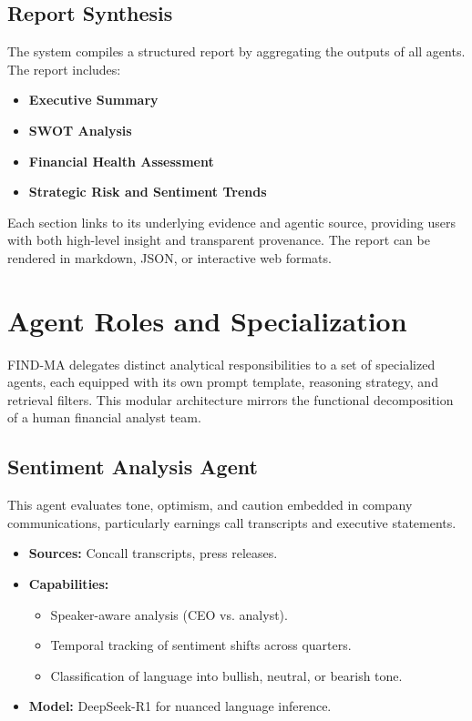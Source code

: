 \documentclass[11pt]{article}
\begin{document}
\subsection*{Report Synthesis}

The system compiles a structured report by aggregating the outputs of all agents. The report includes:
\begin{itemize}
    \item \textbf{Executive Summary}
    \item \textbf{SWOT Analysis}
    \item \textbf{Financial Health Assessment}
    \item \textbf{Strategic Risk and Sentiment Trends}
\end{itemize}

Each section links to its underlying evidence and agentic source, providing users with both high-level insight and transparent provenance. The report can be rendered in markdown, JSON, or interactive web formats.

\section{Agent Roles and Specialization}
\label{sec:agents}

FIND-MA delegates distinct analytical responsibilities to a set of specialized agents, each equipped with its own prompt template, reasoning strategy, and retrieval filters. This modular architecture mirrors the functional decomposition of a human financial analyst team.

\subsection*{Sentiment Analysis Agent}

This agent evaluates tone, optimism, and caution embedded in company communications, particularly earnings call transcripts and executive statements.

\begin{itemize}
    \item \textbf{Sources:} Concall transcripts, press releases.
    \item \textbf{Capabilities:}
        \begin{itemize}
            \item Speaker-aware analysis (CEO vs. analyst).
            \item Temporal tracking of sentiment shifts across quarters.
            \item Classification of language into bullish, neutral, or bearish tone.
        \end{itemize}
    \item \textbf{Model:} DeepSeek-R1 for nuanced language inference.
\end{itemize}
\end{document}
